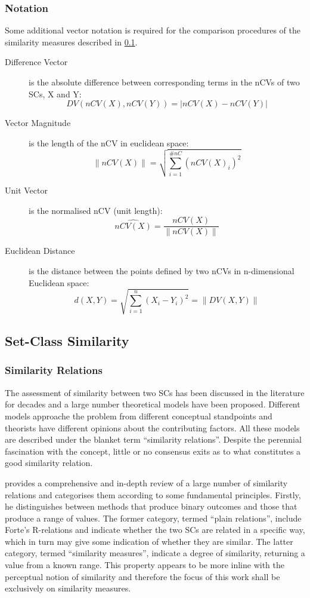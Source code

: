 \documentclass{article}
\begin{document}
\subsubsection{Notation}
\label{sec-3-3-4}

Some additional vector notation is required for the comparison
procedures of the similarity measures described in \ref{sec-3-4}.
\begin{description}
\item[Difference Vector] is the absolute
difference between corresponding terms in the nCVs of two SCs, X and Y:\\
$$DV(nCV(X),nCV(Y))=\left|nCV(X)-nCV(Y)\right|$$ \item[Vector
Magnitude] is the length of the nCV in euclidean space:\\
$$\left\|nCV(X)\right\|=\sqrt{\sum_{i=1}^{\#nC}{(nCV(X)_{i})^{2}}}$$
\item[Unit Vector] is the normalised nCV (unit length):\\
$$\hat{nCV(X)}=\frac{nCV(X)}{\left\|nCV(X)\right\|}$$ \item[Euclidean
Distance] is the distance between the points defined by two nCVs in
n-dimensional Euclidean space:\\
$$d(X,Y)=\sqrt{\sum_{i=1}^{n}{(X_{i}-Y_{i})^{2}}}=\left\|DV(X,Y)\right\|$$
\end{description}
\subsection{Set-Class Similarity}
\label{sec-3-4}
\subsubsection{Similarity Relations}
\label{sec-3-4-1}

The assessment of similarity between two SCs has been discussed in the
literature for decades and a large number theoretical models have been
proposed. Different models approache the problem from different
conceptual standpoints and theorists have different opinions about the
contributing factors. All these models are described under the blanket
term ``similarity relations''. Despite the perennial fascination with
the concept, little or no consensus exits as to what constitutes a
good similarity relation.

\citet{Castren1994} provides a comprehensive and in-depth review of a
large number of similarity relations and categorises them according to
some fundamental principles. Firstly, he distinguishes between methods
that produce binary outcomes and those that produce a range of
values. The former category, termed ``plain relations'', include Forte's
R-relations \citep{Forte1973} and indicate whether the two SCs are
related in a specific way, which in turn may give some indication of
whether they are similar. The latter category, termed ``similarity
measures'', indicate a degree of similarity, returning a value from a
known range. This property appears to be more inline with the
perceptual notion of similarity and therefore the focus of this work
shall be exclusively on similarity measures.
\end{document}
